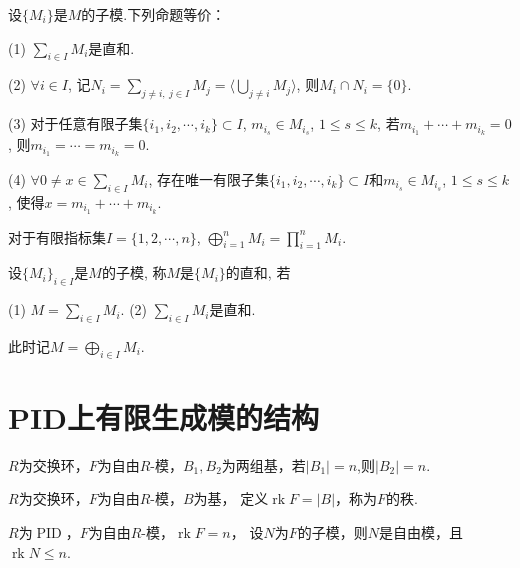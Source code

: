 	\begin{proposition}	
		设$\{M_i\}$是$M$的子模.下列命题等价：\par
		(1) $\sum\limits_{i\in I} M_i$是直和.\par
		(2) $\forall i\in I$, 记$N_i=\sum\limits_{j\neq i,\ j\in I} M_j
        =\big\langle\bigcup\limits_{j\neq i} M_j\big\rangle$, 
        则$M_i\cap N_i=\{0\}$.\par
		(3) 对于任意有限子集$\{ i_1,i_2,\cdots,i_k\}\subset I$, 
        $m_{i_s}\in M_{i_s}$, $1\leq s \leq k$, 
        若$m_{i_1}+\cdots +m_{i_k}=0$, 则$m_{i_1}=\cdots=m_{i_k}=0$.\par
		(4) $\forall 0\neq x\in \sum\limits_{i\in I} M_i$, 
        存在唯一有限子集$\{ i_1,i_2,\cdots,i_k\}\subset I$和$m_{i_s}\in M_{i_s}$, 
        $1\leq s \leq k$, 使得$x=m_{i_1}+\cdots +m_{i_k}$.
	\end{proposition}
	
	
	\begin{example}
		对于有限指标集$I=\{1,2,\cdots,n\}$, $\bigoplus\limits_{i=1}^n M_i=\prod\limits_{i=1}^n M_i$.
	\end{example}
	
	\begin{definition}
		设$\{M_i\}_{i\in I}$是$M$的子模, 称$M$是$\{M_i\}$的直和, 若\par
		\qquad (1) $M=\sum\limits_{i\in I} M_i$. (2) $\sum\limits_{i\in I} M_i$是直和.\par
	此时记$M=\bigoplus\limits_{i\in I} M_i$.
	
	\end{definition}
    \section{PID上有限生成模的结构}

    \begin{lemma}
        $R$为交换环，$F$为自由$R$-模，$B_1,B_2$为两组基，若$\vert B_1\vert =n$,则$\vert B_2\vert =n$.
    \end{lemma}
    \begin{definition}
        $R$为交换环，$F$为自由$R$-模，$B$为基，
        定义$\operatorname{rk}F=\vert B\vert$，称为$F$的秩.
    \end{definition}
    \begin{theorem}
        $R$为$\operatorname{PID}$，$F$为自由$R$-模，$\operatorname{rk}F=n$，
        设$N$为$F$的子模，则$N$是自由模，且$\operatorname{rk}N\leq n$.
    \end{theorem}

